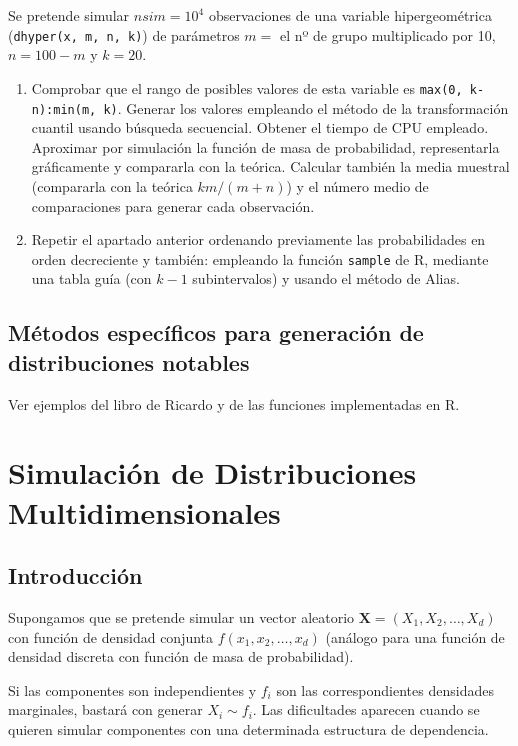 \documentclass[]{book}
\theoremstyle{definition}
\theoremstyle{definition}
\theoremstyle{definition}
\theoremstyle{remark}
\begin{document}
Se pretende simular \(nsim=10^{4}\) observaciones de una variable
hipergeométrica (\texttt{dhyper(x,\ m,\ n,\ k)}) de parámetros \(m=\) el
nº de grupo multiplicado por 10, \(n=100-m\) y \(k=20\).

\begin{enumerate}
\def\labelenumi{\alph{enumi})}
\item
  Comprobar que el rango de posibles valores de esta variable es
  \texttt{max(0,\ k-n):min(m,\ k)}. Generar los valores empleando el
  método de la transformación cuantil usando búsqueda secuencial.
  Obtener el tiempo de CPU empleado. Aproximar por simulación la función
  de masa de probabilidad, representarla gráficamente y compararla con
  la teórica. Calcular también la media muestral (compararla con la
  teórica \(km/(m+n)\)) y el número medio de comparaciones para generar
  cada observación.
\item
  Repetir el apartado anterior ordenando previamente las probabilidades
  en orden decreciente y también: empleando la función \texttt{sample}
  de R, mediante una tabla guía (con \(k-1\) subintervalos) y usando el
  método de Alias.
\end{enumerate}

\section{Métodos específicos para generación de distribuciones
notables}\label{metodos-especificos-para-generacion-de-distribuciones-notables-1}

Ver ejemplos del libro de Ricardo y de las funciones implementadas en R.

\chapter{Simulación de Distribuciones
Multidimensionales}\label{simulacion-de-distribuciones-multidimensionales}

\section{Introducción}\label{introduccion-1}

Supongamos que se pretende simular un vector aleatorio
\(\mathbf{X} =\left( X_1,X_2,\ldots,X_d\right)\) con función de densidad
conjunta \(f\left( x_1,x_2,\ldots,x_d\right)\) (análogo para una función
de densidad discreta con función de masa de probabilidad).

Si las componentes son independientes y \(f_i\) son las correspondientes
densidades marginales, bastará con generar \(X_i \sim f_i\). Las
dificultades aparecen cuando se quieren simular componentes con una
determinada estructura de dependencia.
\end{document}
